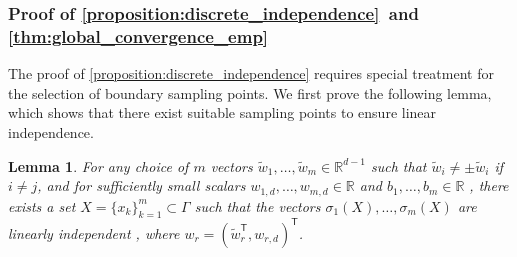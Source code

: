 \documentclass{article}
\newtheorem{lemma}{Lemma}
\newcommand{\T}{\mathsf{T}}
\begin{document}
\subsubsection{Proof of \texorpdfstring{\cref{proposition:discrete_independence}}\ \ and \texorpdfstring{\cref{thm:global_convergence_emp}}{Proposition \ref{proposition:discrete_independence}, Theorem \ref{thm:global_convergence_emp}}}\label{sec:dis independence proof}
The proof of \cref{proposition:discrete_independence} requires special treatment for the selection of boundary sampling points.
We first prove the following lemma, which shows that there exist suitable sampling points to ensure linear independence.
\begin{lemma}\label{proposition:dis independence exixtence} 
    For any choice of \(m\) vectors \(\tilde{w}_1, \ldots, \tilde{w}_m \in \mathbb{R}^{d-1}\) such that $\tilde{w}_{i}\neq \pm \tilde{w}_{i}$ if $i\neq j$, and for sufficiently small scalars \(w_{1,d},\ldots,w_{m,d} \in \mathbb{R}\)  and $b_{1},\ldots,b_{m} \in \mathbb{R}$ , there exists a set $X=\{x_k\}_{k=1}^{m} \subset \Gamma$ such that the vectors \( \sigma_{1}(X),\ldots,\sigma_{m}(X)\) are linearly independent , where $w_{r}=(\tilde{w}_r^\T,w_{r,d})^\T$.
\end{lemma}
\end{document}

